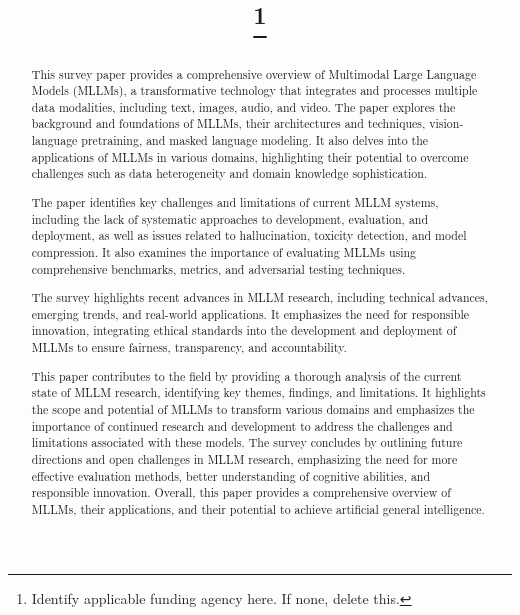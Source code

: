\documentclass[conference]{IEEEtran}
\begin{document}
\title{
\thanks{Identify applicable funding agency here. If none, delete this.}
}

\author{
\and
{}
}

\maketitle

\begin{abstract}
This survey paper provides a comprehensive overview of Multimodal Large Language Models (MLLMs), a transformative technology that integrates and processes multiple data modalities, including text, images, audio, and video. The paper explores the background and foundations of MLLMs, their architectures and techniques, vision-language pretraining, and masked language modeling. It also delves into the applications of MLLMs in various domains, highlighting their potential to overcome challenges such as data heterogeneity and domain knowledge sophistication.

The paper identifies key challenges and limitations of current MLLM systems, including the lack of systematic approaches to development, evaluation, and deployment, as well as issues related to hallucination, toxicity detection, and model compression. It also examines the importance of evaluating MLLMs using comprehensive benchmarks, metrics, and adversarial testing techniques.

The survey highlights recent advances in MLLM research, including technical advances, emerging trends, and real-world applications. It emphasizes the need for responsible innovation, integrating ethical standards into the development and deployment of MLLMs to ensure fairness, transparency, and accountability.

This paper contributes to the field by providing a thorough analysis of the current state of MLLM research, identifying key themes, findings, and limitations. It highlights the scope and potential of MLLMs to transform various domains and emphasizes the importance of continued research and development to address the challenges and limitations associated with these models. The survey concludes by outlining future directions and open challenges in MLLM research, emphasizing the need for more effective evaluation methods, better understanding of cognitive abilities, and responsible innovation. Overall, this paper provides a comprehensive overview of MLLMs, their applications, and their potential to achieve artificial general intelligence.
\end{abstract}
\end{document}
